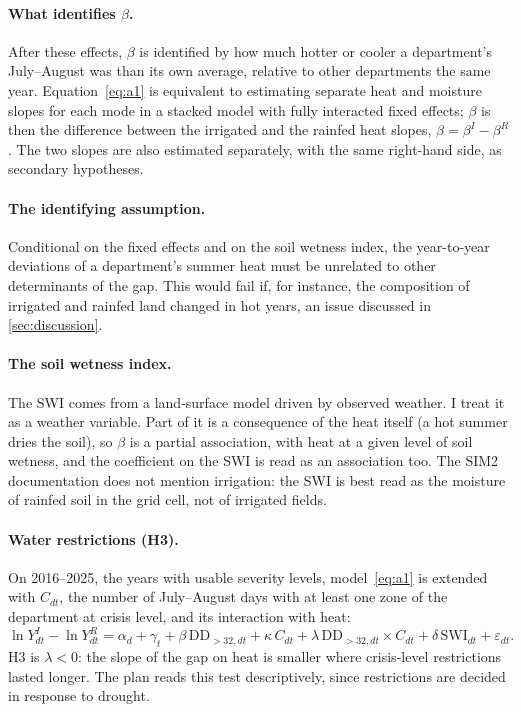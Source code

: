 \paragraph{What identifies $\beta$.} After these effects, $\beta$ is identified by how much hotter or cooler a department's July--August was than its own average, relative to other departments the same year. Equation~\eqref{eq:a1} is equivalent to estimating separate heat and moisture slopes for each mode in a stacked model with fully interacted fixed effects; $\beta$ is then the difference between the irrigated and the rainfed heat slopes, $\beta = \beta^{I} - \beta^{R}$. The two slopes are also estimated separately, with the same right-hand side, as secondary hypotheses.

\paragraph{The identifying assumption.} Conditional on the fixed effects and on the soil wetness index, the year-to-year deviations of a department's summer heat must be unrelated to other determinants of the gap. This would fail if, for instance, the composition of irrigated and rainfed land changed in hot years, an issue discussed in \cref{sec:discussion}.

\paragraph{The soil wetness index.} The SWI comes from a land-surface model driven by observed weather. I treat it as a weather variable. Part of it is a consequence of the heat itself (a hot summer dries the soil), so $\beta$ is a partial association, with heat at a given level of soil wetness, and the coefficient on the SWI is read as an association too. The SIM2 documentation does not mention irrigation: the SWI is best read as the moisture of rainfed soil in the grid cell, not of irrigated fields.

\paragraph{Water restrictions (H3).} On 2016--2025, the years with usable severity levels, model~\eqref{eq:a1} is extended with $C_{dt}$, the number of July--August days with at least one zone of the department at crisis level, and its interaction with heat:
\begin{equation}
\label{eq:h3}
\ln Y^{I}_{dt} - \ln Y^{R}_{dt} = \alpha_d + \gamma_t + \beta\, \mathrm{DD}_{>32,dt} + \kappa\, C_{dt} + \lambda\, \mathrm{DD}_{>32,dt} \times C_{dt} + \delta\, \mathrm{SWI}_{dt} + \varepsilon_{dt}.
\end{equation}
H3 is $\lambda < 0$: the slope of the gap on heat is smaller where crisis-level restrictions lasted longer. The plan reads this test descriptively, since restrictions are decided in response to drought.

